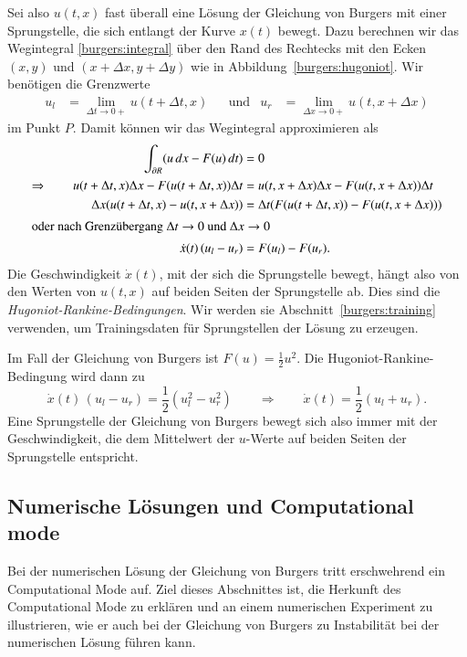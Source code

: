 Sei also $u(t,x)$ fast überall eine Lösung der Gleichung von Burgers mit
einer Sprungstelle, die sich entlangt der Kurve $x(t)$ bewegt.
Dazu berechnen wir das Wegintegral \eqref{burgers:integral} über den Rand
des Rechtecks mit den Ecken $(x,y)$ und $(x+\Delta x, y+\Delta y)$ wie
in Abbildung~\ref{burgers:hugoniot}.
Wir benötigen die Grenzwerte
\[
\begin{aligned}
u_l &= \lim_{\Delta t\to 0+} u(t+\Delta t,x)
&&\text{und}&
u_r &= \lim_{\Delta x\to 0+} u(t,x+\Delta x)
\end{aligned}
\]
im Punkt $P$.
Damit können wir das Wegintegral approximieren als
\begin{align}
\int_{\partial R}(u\,dx -F(u)\,dt)
&=
0
\notag
\\
\Rightarrow\qquad
u(t+\Delta t,x)
\Delta x
-
F(u(t+\Delta t,x))
\Delta t
&=
u(t,x+\Delta x) \Delta x
-
F(u(t,x+\Delta x)) \Delta t
\notag
\\
\Delta x
(
u(t+\Delta t,x)
-
u(t,x+\Delta x)
)
&=
\Delta t
(F(u(t+\Delta t,x))
-
F(u(t,x+\Delta x))
)
\notag
\\
\intertext{oder nach Grenzübergang $\Delta t\to 0$ und $\Delta x\to 0$}
\dot x(t)\, (u_l-u_r) &= F(u_l) - F(u_r).
\label{burgers:hugoniot-rankine}
\end{align}
Die Geschwindigkeit $\dot{x}(t)$, mit der sich die Sprungstelle bewegt,
hängt also 
von den Werten von $u(t,x)$ auf beiden Seiten der Sprungstelle ab.
Dies sind die {\em Hugoniot-Rankine-Bedingungen}.
Wir werden sie Abschnitt~\ref{burgers:training} verwenden, um Trainingsdaten
für Sprungstellen der Lösung zu erzeugen.

Im Fall der Gleichung von Burgers ist $F(u)=\frac12u^2$.
Die Hugoniot-Rankine-Bedingung wird dann zu
\begin{equation}
\dot x(t)\, (u_l-u_r) = \frac12 (u_l^2-u_r^2)
\qquad\Rightarrow\qquad
\dot x(t)
=
\frac12 (u_l+u_r).
\end{equation}
Eine Sprungstelle der Gleichung von Burgers bewegt sich also immer
mit der Geschwindigkeit, die dem Mittelwert der $u$-Werte auf
beiden Seiten der Sprungstelle entspricht.

\subsection{Numerische Lösungen und Computational mode}
Bei der numerischen Lösung der Gleichung von Burgers tritt erschwehrend ein
Computational Mode auf.
Ziel dieses Abschnittes ist, die Herkunft des Computational Mode zu erklären
und an einem numerischen Experiment zu illustrieren, wie er auch bei
der Gleichung von Burgers zu Instabilität bei der numerischen
Lösung führen kann.

